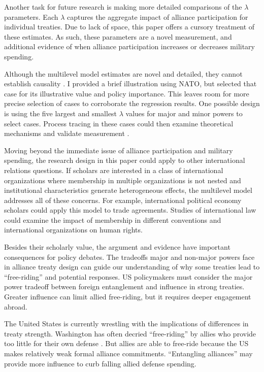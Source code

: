 \documentclass[12pt]{article}
\begin{document}
Another task for future research is making more detailed comparisons of the $\lambda$ parameters. 
Each $\lambda$ captures the aggregate impact of alliance participation for individual treaties.
Due to lack of space, this paper offers a cursory treatment of these estimates. 
As such, these parameters are a novel measurement, and additional evidence of when alliance participation increases or decreases military spending. 


Although the multilevel model estimates are novel and detailed, they cannot establish causality \citep{Seawright2016}. 
I provided a brief illustration using NATO, but selected that case for its illustrative value and policy importance. 
This leaves room for more precise selection of cases to corroborate the regression results. 
One possible design is using the five largest and smallest $\lambda$ values for major and minor powers to select cases. 
Process tracing in these cases could then examine theoretical mechanisms and validate measurement \citep{Seawright2016}. 


Moving beyond the immediate issue of alliance participation and military spending, the research design in this paper could apply to other international relations questions.
If scholars are interested in a class of international organizations where membership in multiple organizations is not nested and institutional characteristics generate heterogeneous effects, the multilevel model addresses all of these concerns.
For example, international political economy scholars could apply this model to trade agreements. 
Studies of international law could examine the impact of membership in different conventions and international organizations on human rights. 


Besides their scholarly value, the argument and evidence have important consequences for policy debates. 
The tradeoffs major and non-major powers face in alliance treaty design can guide our understanding of why some treaties lead to ``free-riding'' and potential responses. 
US policymakers must consider the major power tradeoff between foreign entanglement and influence in strong treaties. 
Greater influence can limit allied free-riding, but it requires deeper engagement abroad. 


The United States is currently wrestling with the implications of differences in treaty strength. 
Washington has often decried ``free-riding'' by allies who provide too little for their own defense \citep{Lanoszka2015}. 
But allies are able to free-ride because the US makes relatively weak formal alliance commitments. 
``Entangling alliances'' may provide more influence to curb falling allied defense spending. 
\end{document}
